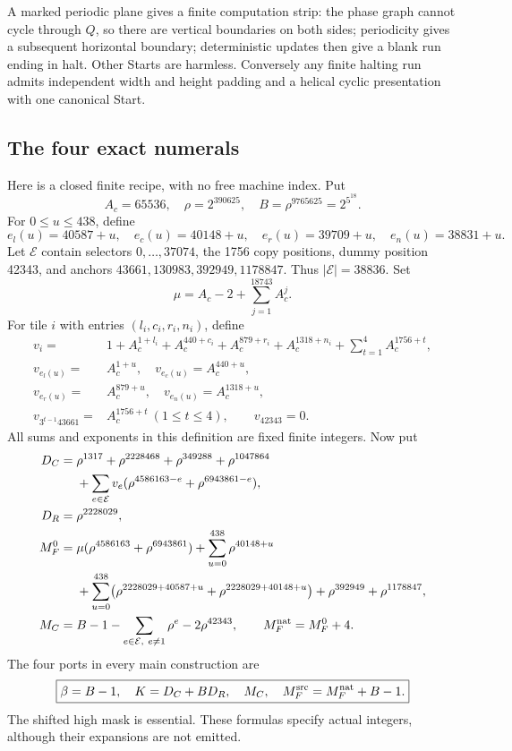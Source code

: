 \documentclass[11pt]{article}
\begin{document}
A marked periodic plane gives a finite computation strip: the phase graph cannot cycle through $Q$, so there are vertical boundaries on both sides; periodicity gives a subsequent horizontal boundary; deterministic updates then give a blank run ending in halt. Other Starts are harmless. Conversely any finite halting run admits independent width and height padding and a helical cyclic presentation with one canonical Start.

\subsection{The four exact numerals}
Here is a closed finite recipe, with no free machine index. Put
\[
A_c=65536,\quad \rho=2^{390625},\quad
B=\rho^{9765625}=2^{5^{18}}.
\]
For $0\le u\le438$, define
\[
e_l(u)=40587+u,\quad e_c(u)=40148+u,\quad
e_r(u)=39709+u,\quad e_n(u)=38831+u.
\]
Let $\mathcal E$ contain selectors $0,\ldots,37074$, the 1756 copy positions, dummy position 42343, and anchors
$43661,130983,392949,1178847$. Thus $|\mathcal E|=38836$. Set
\[
\mu=A_c-2+\sum_{j=1}^{18743}A_c^j.
\]
For tile $i$ with entries $(l_i,c_i,r_i,n_i)$, define
\begin{align*}
v_i={}&1+A_c^{1+l_i}+A_c^{440+c_i}+A_c^{879+r_i}+A_c^{1318+n_i}
          +\sum_{t=1}^4 A_c^{1756+t},\\
v_{e_l(u)}={}&A_c^{1+u},\quad v_{e_c(u)}=A_c^{440+u},\\
v_{e_r(u)}={}&A_c^{879+u},\quad v_{e_n(u)}=A_c^{1318+u},\\
v_{3^{t-1}43661}={}&A_c^{1756+t}\ (1\le t\le4),\qquad v_{42343}=0.
\end{align*}
All sums and exponents in this definition are fixed finite integers. Now put
\begin{align*}
D_C={}&\rho^{1317}+\rho^{2228468}+\rho^{349288}+\rho^{1047864}\\
&+\sum_{e\in\mathcal E}v_e(\rho^{4586163-e}+\rho^{6943861-e}),\\
D_R={}&\rho^{2228029},\\
M_F^0={}&\mu(\rho^{4586163}+\rho^{6943861})+\sum_{u=0}^{438}\rho^{40148+u}\\
&+\sum_{u=0}^{438}\bigl(\rho^{2228029+40587+u}+\rho^{2228029+40148+u}\bigr)
 +\rho^{392949}+\rho^{1178847},\\
M_C={}&B-1-\sum_{e\in\mathcal E,\ e\ne1}\rho^e-2\rho^{42343},
\qquad M_F^{\rm nat}=M_F^0+4.
\end{align*}
The four ports in every main construction are
\[
\boxed{\beta=B-1,\quad K=D_C+BD_R,\quad M_C,\quad
M_F^{\rm src}=M_F^{\rm nat}+B-1.}
\]
The shifted high mask is essential. These formulas specify actual integers, although their expansions are not emitted.
\end{document}
